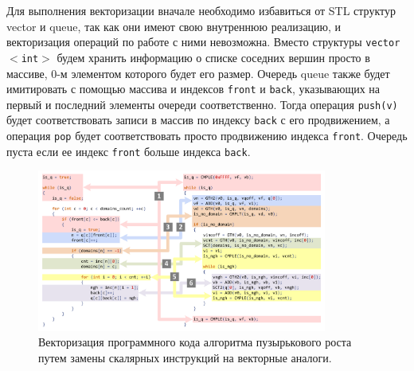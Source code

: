 \documentclass[
11pt,%
tightenlines,%
twoside,%
onecolumn,%
nofloats,%
nobibnotes,%
nofootinbib,%
superscriptaddress,%
noshowpacs,%
centertags]%
{revtex4}
\begin{document}
Для выполнения векторизации вначале необходимо избавиться от STL структур vector и queue, так как они имеют свою внутреннюю реализацию, и векторизация операций по работе с ними невозможна.
Вместо структуры \texttt{vector$<$int$>$} будем хранить информацию о списке соседних вершин просто в массиве, 0-м элементом которого будет его размер.
Очередь queue также будет имитировать с помощью массива и индексов \texttt{front} и \texttt{back}, указывающих на первый и последний элементы очереди соответственно.
Тогда операция \texttt{push(v)} будет соответствовать записи в массив по индексу \texttt{back} с его продвижением, а операция \texttt{pop} будет соответствовать просто продвижению индекса \texttt{front}.
Очередь пуста если ее индекс \texttt{front} больше индекса \texttt{back}.

\begin{figure}[h]
\setcaptionmargin{5mm}
\onelinecaptionsfalse %
\includegraphics[width=0.85\textwidth]{pics/code.pdf}
\caption{Векторизация программного кода алгоритма пузырькового роста путем замены скалярных инструкций на векторные аналоги.}\label{fig:code}
\end{figure}
\end{document}
